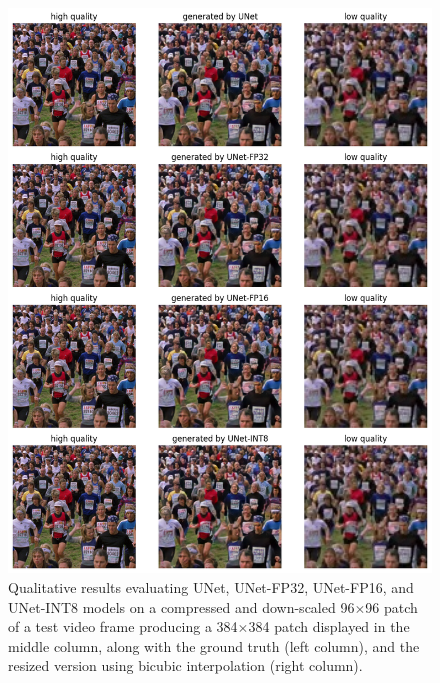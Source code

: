 \begin{figure}[ht]
\includegraphics[width=1.0\textwidth]{static/02_unet_qualitative_results.png}
\caption{Qualitative results evaluating UNet, UNet-FP32, UNet-FP16, and UNet-INT8 models on a compressed and down-scaled 96$\times$96 patch of a test video frame producing a 384$\times$384 patch displayed in the middle column, along with the ground truth (left column), and the resized version using bicubic interpolation (right column).}
\label{fig:crowd-qualitative-unet}
\end{figure}

